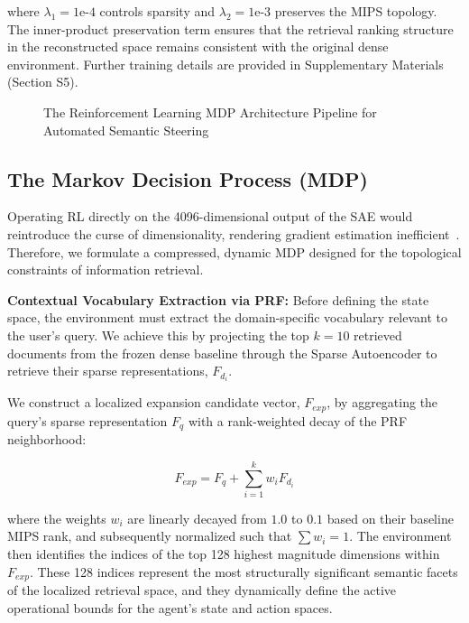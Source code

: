 \documentclass[sigconf]{acmart}
\begin{document}
where $\lambda_1 = 1\text{e-}4$ controls sparsity and $\lambda_2 = 1\text{e-}3$ preserves the MIPS topology. The inner-product preservation term ensures that the retrieval ranking structure in the reconstructed space remains consistent with the original dense environment. Further training details are provided in Supplementary Materials (Section S5).

\begin{figure}[t]
  \centering
  \caption{The Reinforcement Learning MDP Architecture Pipeline for Automated Semantic Steering}
  \label{fig:architecture}
\end{figure}

\subsection{The Markov Decision Process (MDP)}

Operating RL directly on the 4096-dimensional output of the SAE would reintroduce the curse of dimensionality, rendering gradient estimation inefficient~\cite{lillicrap2016}. Therefore, we formulate a compressed, dynamic MDP designed for the topological constraints of information retrieval.

\textbf{Contextual Vocabulary Extraction via PRF:} Before defining the state space, the environment must extract the domain-specific vocabulary relevant to the user's query. We achieve this by projecting the top $k=10$ retrieved documents from the frozen dense baseline through the Sparse Autoencoder to retrieve their sparse representations, $F_{d_i}$.

We construct a localized expansion candidate vector, $F_{exp}$, by aggregating the query's sparse representation $F_q$ with a rank-weighted decay of the PRF neighborhood:

\begin{equation}
F_{exp} = F_q + \sum_{i=1}^{k} w_i F_{d_i}
\end{equation}

where the weights $w_i$ are linearly decayed from $1.0$ to $0.1$ based on their baseline MIPS rank, and subsequently normalized such that $\sum w_i = 1$. The environment then identifies the indices of the top 128 highest magnitude dimensions within $F_{exp}$. These 128 indices represent the most structurally significant semantic facets of the localized retrieval space, and they dynamically define the active operational bounds for the agent's state and action spaces.
\end{document}
